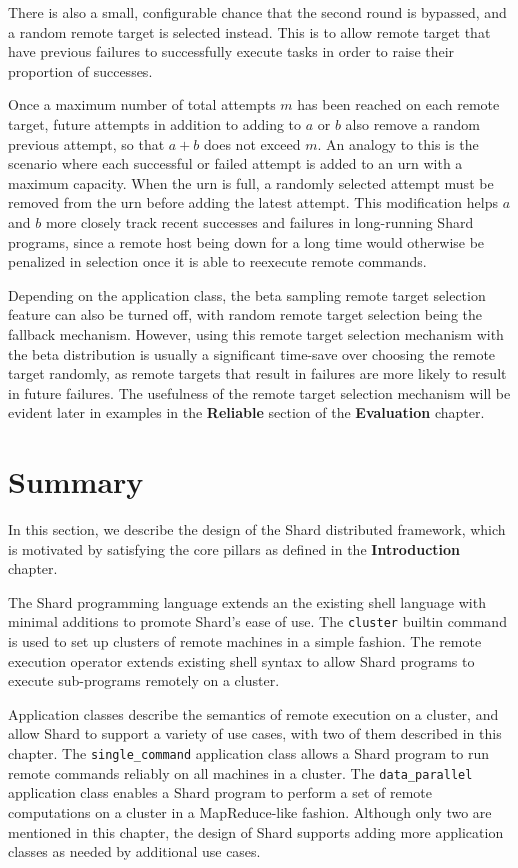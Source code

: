\documentclass[oneside]{report}
\begin{document}
There is also a small, configurable chance that the second round is bypassed, and a random remote target is selected instead.
This is to allow remote target that have previous failures to successfully execute tasks in order to raise their proportion of successes.

Once a maximum number of total attempts $m$ has been reached on each remote target, future attempts in addition to adding to $a$ or $b$ also remove a random previous attempt, so that $a+b$ does not exceed $m$.
An analogy to this is the scenario where each successful or failed attempt is added to an urn with a maximum capacity.
When the urn is full, a randomly selected attempt must be removed from the urn before adding the latest attempt.
This modification helps $a$ and $b$ more closely track recent successes and failures in long-running Shard programs, since a remote host being down for a long time would otherwise be penalized in selection once it is able to reexecute remote commands.

Depending on the application class, the beta sampling remote target selection feature can also be turned off, with random remote target selection being the fallback mechanism.
However, using this remote target selection mechanism with the beta distribution is usually a significant time-save over choosing the remote target randomly, as remote targets that result in failures are more likely to result in future failures.
The usefulness of the remote target selection mechanism will be evident later in examples in the \textbf{Reliable} section of the \textbf{Evaluation} chapter.

\section{Summary}

In this section, we describe the design of the Shard distributed framework, which is motivated by satisfying the core pillars as defined in the \textbf{Introduction} chapter.

The Shard programming language extends an the existing shell language with minimal additions to promote Shard's ease of use.
The \texttt{cluster} builtin command is used to set up clusters of remote machines in a simple fashion.
The remote execution operator extends existing shell syntax to allow Shard programs to execute sub-programs remotely on a cluster.

Application classes describe the semantics of remote execution on a cluster, and allow Shard to support a variety of use cases, with two of them described in this chapter.
The \texttt{single\_command} application class allows a Shard program to run remote commands reliably on all machines in a cluster.
The \texttt{data\_parallel} application class enables a Shard program to perform a set of remote computations on a cluster in a MapReduce-like fashion.
Although only two are mentioned in this chapter, the design of Shard supports adding more application classes as needed by additional use cases.
\end{document}

